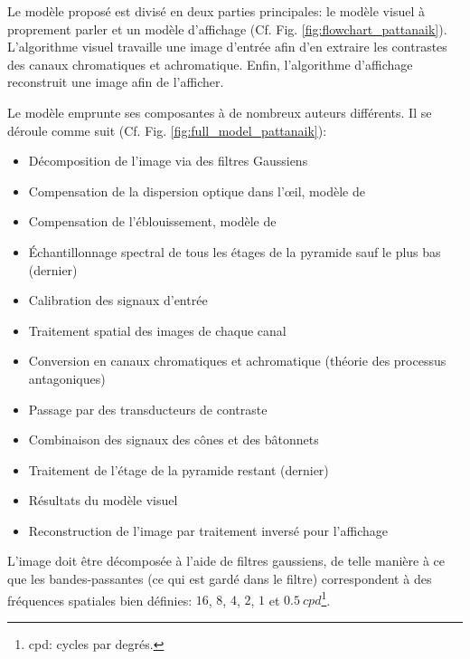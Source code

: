 	\par Le modèle proposé est divisé en deux parties principales: le modèle visuel à proprement parler et un modèle d'affichage (Cf. Fig. \ref{fig:flowchart_pattanaik}). L'algorithme visuel travaille une image d'entrée afin d'en extraire les contrastes des canaux chromatiques et achromatique. Enfin, l'algorithme d'affichage reconstruit une image afin de l'afficher.
	
	\par Le modèle emprunte ses composantes à de nombreux auteurs différents. Il se déroule comme suit (Cf. Fig. \ref{fig:full_model_pattanaik}):
	\begin{itemize}
		\item Décomposition de l'image via des filtres Gaussiens
		\item Compensation de la dispersion optique dans l'œil, modèle de \citep{westheimer_eye_1986}
		\item Compensation de l'éblouissement, modèle de \citep{spencer_physically-based_1995}
		\item Échantillonnage spectral de tous les étages de la pyramide sauf le plus bas (dernier) \citep{fairchild_color_1998,wyszecki_color_2000}
		\item Calibration des signaux d'entrée
		\item Traitement spatial des images de chaque canal \citep{burt_laplacian_1983, peli_contrast_1990}
		\item Conversion en canaux chromatiques et achromatique (théorie des processus antagoniques) \citep{hunt_reproduction_1995,fairchild_color_1998}
		\item Passage par des transducteurs de contraste \citep{watson_model_1997}
		\item Combinaison des signaux des cônes et des bâtonnets
		\item Traitement de l'étage de la pyramide restant (dernier) \citep{fairchild_color_1998}
		\item Résultats du modèle visuel
		\item Reconstruction de l'image par traitement inversé pour l'affichage
	\end{itemize}
	
	\par L'image doit être décomposée à l'aide de filtres gaussiens, de telle manière à ce que les bandes-passantes (ce qui est gardé dans le filtre) correspondent à des fréquences spatiales bien définies: $16$, $8$, $4$, $2$, $1$ et $0.5~cpd$\footnote{cpd: cycles par degrés.}.
	
